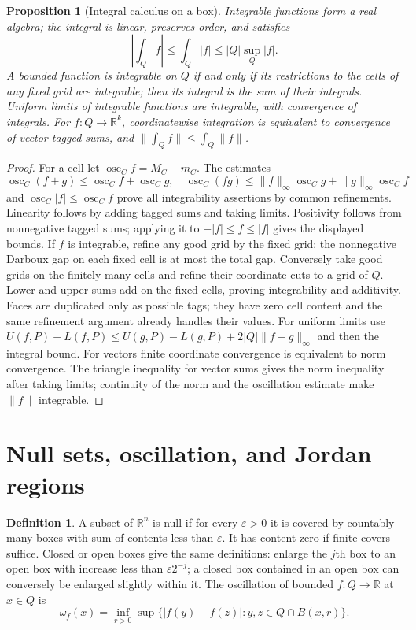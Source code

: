 \documentclass[11pt,oneside,openany]{book}
\newtheorem{proposition}[theorem]{Proposition}
\theoremstyle{definition}
\newtheorem{definition}[theorem]{Definition}
\theoremstyle{remark}
\newcommand{\R}{\mathbb R}
\newcommand{\eps}{\varepsilon}
\newcommand{\norm}[1]{\lVert#1\rVert}
\newcommand{\family}[1]{}
\begin{document}
\family{K04.06.03}\family{K04.06.04}
\begin{proposition}[Integral calculus on a box]\label{d04:06:algebra}
Integrable functions form a real algebra; the integral is linear, preserves order, and satisfies
\[
 \left|\int_Q f\right|\leq\int_Q|f|\leq |Q|\sup_Q|f|.
\]
A bounded function is integrable on $Q$ if and only if its restrictions to the cells of any fixed grid are integrable; then its integral is the sum of their integrals. Uniform limits of integrable functions are integrable, with convergence of integrals.
For $f:Q\to\R^k$, coordinatewise integration is equivalent to convergence of vector tagged sums, and $\norm{\int_Q f}\leq\int_Q\norm f$.
\end{proposition}
\begin{proof}
For a cell let $\operatorname{osc}_C f=M_C-m_C$. The estimates
\[
 \operatorname{osc}_C(f+g)\leq\operatorname{osc}_C f+\operatorname{osc}_C g,
 \quad\operatorname{osc}_C(fg)\leq\norm f_\infty\operatorname{osc}_C g+\norm g_\infty\operatorname{osc}_C f
\]
and $\operatorname{osc}_C|f|\leq\operatorname{osc}_C f$ prove all integrability assertions by common refinements. Linearity follows by adding tagged sums and taking limits. Positivity follows from nonnegative tagged sums; applying it to $-|f|\leq f\leq|f|$ gives the displayed bounds.
If $f$ is integrable, refine any good grid by the fixed grid; the nonnegative Darboux gap on each fixed cell is at most the total gap. Conversely take good grids on the finitely many cells and refine their coordinate cuts to a grid of $Q$. Lower and upper sums add on the fixed cells, proving integrability and additivity. Faces are duplicated only as possible tags; they have zero cell content and the same refinement argument already handles their values. For uniform limits use
$U(f,P)-L(f,P)\leq U(g,P)-L(g,P)+2|Q|\norm{f-g}_\infty$ and then the integral bound. For vectors finite coordinate convergence is equivalent to norm convergence. The triangle inequality for vector sums gives the norm inequality after taking limits; continuity of the norm and the oscillation estimate make $\norm f$ integrable.
\end{proof}

\section{Null sets, oscillation, and Jordan regions}
\family{K04.06.05}\family{K04.06.06}
\begin{definition}\label{d04:06:null}
A subset of $\R^n$ is null if for every $\eps>0$ it is covered by countably many boxes with sum of contents less than $\eps$. It has content zero if finite covers suffice. Closed or open boxes give the same definitions: enlarge the $j$th box to an open box with increase less than $\eps2^{-j}$; a closed box contained in an open box can conversely be enlarged slightly within it. The oscillation of bounded $f:Q\to\R$ at $x\in Q$ is
\[
 \omega_f(x)=\inf_{r>0}\sup\{|f(y)-f(z)|:y,z\in Q\cap B(x,r)\}.
\]
\end{definition}
\end{document}

